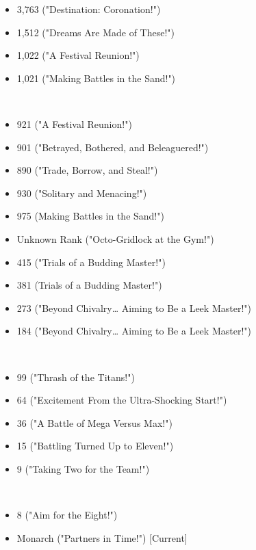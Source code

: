\documentclass[a4paper,12pt]{article}
\begin{document}
\begin{itemize}
\item 3,763 ("Destination: Coronation!")
\item 1,512 ("Dreams Are Made of These!")
\item 1,022 ("A Festival Reunion!")
\item 1,021 ("Making Battles in the Sand!")
\end{itemize}\\ \par \vspace{0.5cm}

\begin{itemize}
\item 921 ("A Festival Reunion!")
\item 901 ("Betrayed, Bothered, and Beleaguered!")
\item 890 ("Trade, Borrow, and Steal!")
\item 930 ("Solitary and Menacing!")
\item 975 (Making Battles in the Sand!")
\item Unknown Rank ("Octo-Gridlock at the Gym!")
\item 415 ("Trials of a Budding Master!")
\item 381 (Trials of a Budding Master!")
\item 273 ("Beyond Chivalry… Aiming to Be a Leek Master!")
\item 184 ("Beyond Chivalry… Aiming to Be a Leek Master!")
\end{itemize}\\ \par \vspace{0.5cm}

\begin{itemize}
\item 99 ("Thrash of the Titans!")
\item 64 ("Excitement From the Ultra-Shocking Start!")
\item 36 ("A Battle of Mega Versus Max!")
\item 15 ("Battling Turned Up to Eleven!")
\item 9 ("Taking Two for the Team!")
\end{itemize}\\ \par \vspace{0.5cm}

\begin{itemize}
\item 8 ("Aim for the Eight!")
\item Monarch ("Partners in Time!") [Current]
\end{itemize}\\ \par \vspace{0.5cm}
\end{document}
